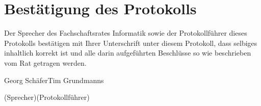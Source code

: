 \documentclass[a4paper, 11pt]{article} %
\newcommand{\abstimmung}[4]{
	\newcounter{summe}
	\setcounter{summe}{#3}
	\addtocounter{summe}{#4}
	\begin{flushleft}
		#1\\
	Es wird über den Antrag abgestimmt.
	\end{flushleft}
	\ifthenelse{\equal{#3}{0}\AND\equal{#4}{0}}{
	\begin{center}
		\textbf{Der Antrag wird einstimmig angenommen.}
	\end{center}
	}{
	\begin{center}
		#2 \ifthenelse{\equal{#2}{1}}{Stimme}{Stimmen} dafür, #3 \ifthenelse{\equal{#3}{1}}{Stimme}{Stimmen} dagegen, #4 \ifthenelse{\equal{#42}{1}}{Enthaltung}{Enthaltungen}\\
		\ifthenelse{#2>\value{summe}}{
		\textbf{Der Antrag ist somit angenommen.}
		}{
		\textbf{Der Antrag ist somit abgelehnt.}
		}
	\end{center}
	}  
}
\newcommand{\protokoller}{Tim Grundmanns}
\newcommand{\fsiPresident}{Georg Schäfer}
\begin{document}

\pagebreak
\section{Bestätigung des Protokolls}
Der Sprecher des Fachschaftsrates Informatik sowie der Protokollführer dieses Protokolls bestätigen mit Ihrer Unterschrift unter diesem Protokoll, dass selbiges inhaltlich korrekt ist und alle darin aufgeführten Beschlüsse so wie beschrieben vom Rat getragen werden.
\\

\vspace{3.5cm}
\hrulefill \hfill \hrulefill

\fsiPresident \hfill \protokoller

{\footnotesize (Sprecher)\hfill (Protokollführer)}
\end{document}
